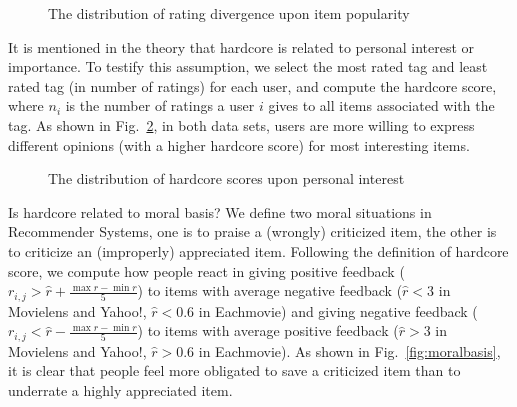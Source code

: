 \documentclass{sig-alternate}
\begin{document}
\begin{figure}[htbp]
\centering
\centering
{}
\caption{The distribution of rating divergence upon item popularity}
\label{fig:popularity}
\end{figure}

It is mentioned in the theory\cite{Neolle-Neumann1993spiral} that hardcore is related to personal interest or importance. To testify this assumption, we select the most rated tag and least rated tag (in number of ratings) for each user, and compute the hardcore score, where $n_i$ is the number of ratings a user $i$ gives to all items associated with the tag.  As shown in Fig.~\ref{fig:personalinterest}, in both data sets, users are more willing to express different opinions (with a higher hardcore score) for most interesting items.

\begin{figure}[htbp]
\centering
\centering
{}
\caption{The distribution of hardcore scores upon personal interest}
\label{fig:personalinterest}
\end{figure}

Is hardcore related to moral basis? We define two moral situations in Recommender Systems, one is to praise a (wrongly) criticized item, the other is to criticize an (improperly) appreciated item. Following the definition of hardcore score, we compute how people react in giving positive feedback ($r_{i,j}>\hat{r}+\frac{\max{r}-\min{r}}{5}$) to items with average negative feedback ($\hat{r}<3$ in Movielens and Yahoo!, $\hat{r}<0.6$ in Eachmovie) and giving negative feedback ($r_{i,j}<\hat{r}-\frac{\max{r}-\min{r}}{5}$) to items with average positive feedback ($\hat{r}>3$ in Movielens and Yahoo!, $\hat{r}>0.6$ in Eachmovie). As shown in Fig.~\ref{fig:moralbasis}, it is clear that people feel more obligated to save a criticized item than to underrate a highly appreciated item.
\end{document}
